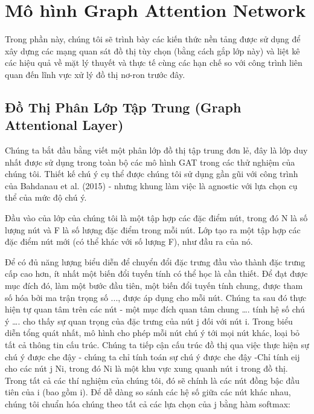 \chapter{Mô hình Graph Attention Network}
\label{chap:gat-architecture}


Trong phần này, chúng tôi sẽ trình bày các kiến thức nền tảng được sử dụng để xây dựng các mạng quan sát đồ thị tùy chọn (bằng cách gắp lớp này) và liệt kê các hiệu quả về mặt lý thuyết và thực tế cùng các hạn chế so với công trình liên quan đến lĩnh vực xử lý đồ thị nơ-ron trước đây.




\section{Đồ Thị Phân Lớp Tập Trung (Graph Attentional Layer)}
Chúng ta bắt đầu bằng viết một phân lớp đồ thị tập trung đơn lẻ, đây là lớp duy nhất được sử dụng trong toàn bộ các mô hình GAT trong các thử nghiệm của chúng tôi. Thiết kế chú ý cụ thể được chúng tôi sử dụng gần gũi với công trình của Bahdanau et al. (2015) - nhưng khung làm việc là agnostic với lựa chọn cụ thể của mức độ chú ý.

Đầu vào của lớp của chúng tôi là một tập hợp các đặc điểm nút, trong đó N là số lượng nút và F là số lượng đặc điểm trong mỗi nút. Lớp tạo ra một tập hợp các đặc điểm nút mới (có thể khác với số lượng F), như đầu ra của nó.

Để có đủ năng lượng biểu diễn để chuyển đổi đặc trưng đầu vào thành đặc trưng cấp cao hơn, ít nhất một biến đổi tuyến tính có thể học là cần thiết. Để đạt được mục đích đó, làm một bước đầu tiên, một biến đổi tuyến tính chung, được tham số hóa bởi ma trận trọng số  ..., được áp dụng cho mỗi nút. Chúng ta sau đó thực hiện tự quan tâm trên các nút - một mục đích quan tâm chung …. tính hệ số chú ý
….
cho thấy sự quan trọng của đặc trưng của nút j đối với nút i. Trong biểu diễn tổng quát nhất, mô hình cho phép mỗi nút chú ý tới mọi nút khác, loại bỏ tất cả thông tin cấu trúc. Chúng ta tiếp cận cấu trúc đồ thị qua việc thực hiện sự chú ý được che đậy - chúng ta chỉ tính toán sự chú ý được che đậy -Chỉ tính eij cho các nút j  Ni, trong đó Ni là một khu vực xung quanh nút i trong đồ thị. Trong tất cả các thí nghiệm của chúng tôi, đó sẽ chính là các nút đồng bậc đầu tiên của i (bao gồm i). Để dễ dàng so sánh các hệ số giữa các nút khác nhau, chúng tôi chuẩn hóa chúng theo tất cả các lựa chọn của j bằng hàm softmax:

